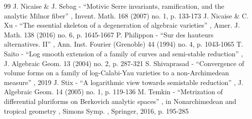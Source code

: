 \documentclass[11pt]{article}
\theoremstyle{definition}
\numberwithin{equation}{subsection}
\begin{document}
\begin{thebibliography}{99}
 J. Nicaise \& J. Sebag - “Motivic Serre invariants, ramification, and the analytic Milnor fiber” , Invent. Math. 168 (2007) no. 1, p. 133-173
 J. Nicaise \& C. Xu - “The essential skeleton of a degeneration of algebraic varieties” , Amer. J. Math. 138 (2016) no. 6, p. 1645-1667
 P. Philippon - “Sur des hauteurs alternatives. II” , Ann. Inst. Fourier (Grenoble) 44 (1994) no. 4, p. 1043-1065
 T. Saito - “Log smooth extension of a family of curves and semi-stable reduction” , J. Algebraic Geom. 13 (2004) no. 2, p. 287-321
 S. Shivaprasad - “Convergence of volume forms on a family of log-Calabi-Yau varieties to a non-Archimedean measure” , 2019
 J. Stix - “A logarithmic view towards semistable reduction” , J. Algebraic Geom. 14 (2005) no. 1, p. 119-136
 M. Temkin - “Metrization of differential pluriforms on Berkovich analytic spaces” , in Nonarchimedean and tropical geometry , Simons Symp. , Springer, 2016, p. 195-285
\end{thebibliography}
\end{document}
